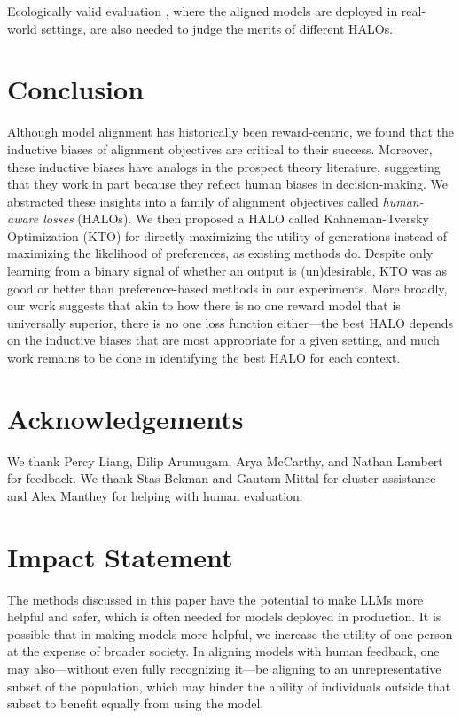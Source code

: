 Ecologically valid evaluation \citep{de2020towards}, where the aligned models are deployed in real-world settings, are also needed to judge the merits of different HALOs.

    
\section{Conclusion}

Although model alignment has historically been reward-centric, we found that the inductive biases of alignment objectives are critical to their success.
Moreover, these inductive biases have analogs in the prospect theory literature, suggesting that they work in part because they reflect human biases in decision-making.
We abstracted these insights into a family of alignment objectives called \textit{human-aware losses} (HALOs).
We then proposed a HALO called Kahneman-Tversky Optimization (KTO) for directly maximizing the utility of generations instead of maximizing the likelihood of preferences, as existing methods do.
Despite only learning from a binary signal of whether an output is (un)desirable, KTO was as good or better than preference-based methods in our experiments.
More broadly, our work suggests that akin to how there is no one reward model that is universally superior, there is no one loss function either---the best HALO depends on the inductive biases that are most appropriate for a given setting, and much work remains to be done in identifying the best HALO for each context.

\section*{Acknowledgements}

We thank Percy Liang, Dilip Arumugam, Arya McCarthy, and Nathan Lambert for feedback.
We thank Stas Bekman and Gautam Mittal for cluster assistance and Alex Manthey for helping with human evaluation.

\section*{Impact Statement}

The methods discussed in this paper have the potential to make LLMs more helpful and safer, which is often needed for models deployed in production.
It is possible that in making models more helpful, we increase the utility of one person at the expense of broader society.
In aligning models with human feedback, one may also---without even fully recognizing it---be aligning to an unrepresentative subset of the population, which may hinder the ability of individuals outside that subset to benefit equally from using the model.

